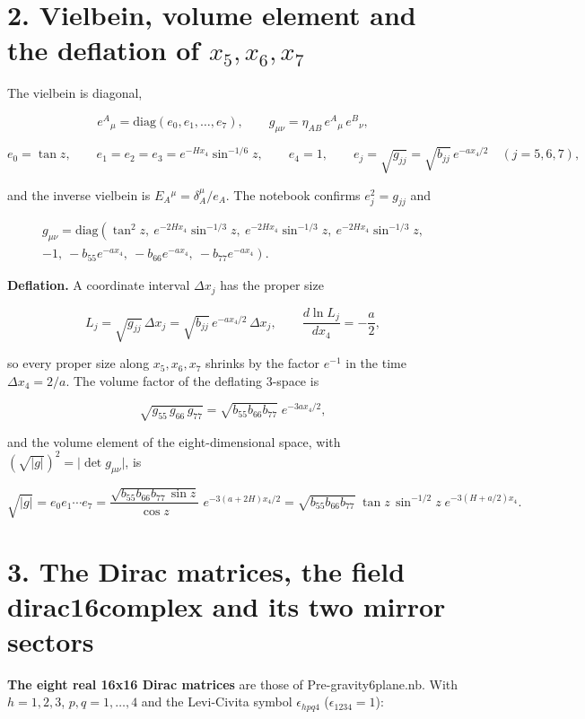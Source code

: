 \documentclass[10pt]{article}
\makeatletter
\newcommand\keepnext{\par\nopagebreak\@nobreaktrue\everypar{\@nobreakfalse\everypar{}}}
\makeatother
\begin{document}
\section*{2. Vielbein, volume element and the deflation of $x_5, x_6, x_7$}

The vielbein is diagonal,\keepnext


\[
e^A{}_\mu = \mathrm{diag}(e_0, e_1, \dots, e_7), \qquad g_{\mu\nu} = \eta_{AB}\,e^A{}_\mu\,e^B{}_\nu ,
\]

\[
e_0 = \tan z, \qquad e_1 = e_2 = e_3 = e^{-Hx_4}\sin^{-1/6}z, \qquad e_4 = 1, \qquad e_j = \sqrt{g_{jj}} = \sqrt{b_{jj}}\,e^{-ax_4/2} \quad (j = 5, 6, 7),
\]

and the inverse vielbein is $E_A{}^\mu = \delta_A^\mu/e_A$. The notebook confirms $e_j^2 = g_{jj}$ and\keepnext


\[
\begin{gathered}
g_{\mu\nu} = \mathrm{diag}\left(\tan^2 z,\ e^{-2Hx_4}\sin^{-1/3}z,\ e^{-2Hx_4}\sin^{-1/3}z,\ e^{-2Hx_4}\sin^{-1/3}z,\right. \\
\left. -1,\ -b_{55}e^{-ax_4},\ -b_{66}e^{-ax_4},\ -b_{77}e^{-ax_4}\right).
\end{gathered}
\]

\textbf{Deflation.} A coordinate interval $\Delta x_j$ has the proper size\keepnext


\[
L_j = \sqrt{g_{jj}}\,\Delta x_j = \sqrt{b_{jj}}\,e^{-ax_4/2}\,\Delta x_j, \qquad \frac{d\ln L_j}{dx_4} = -\frac a2 ,
\]

so every proper size along $x_5, x_6, x_7$ shrinks by the factor $e^{-1}$ in the time $\Delta x_4 = 2/a$. The volume factor of the deflating 3-space is\keepnext


\[
\sqrt{g_{55}\,g_{66}\,g_{77}} = \sqrt{b_{55}b_{66}b_{77}}\;e^{-3ax_4/2} ,
\]

and the volume element of the eight-dimensional space, with $\left(\sqrt{\lvert g\rvert}\right)^2 = \lvert\det g_{\mu\nu}\rvert$, is\keepnext


\[
\sqrt{\lvert g\rvert} = e_0e_1\cdots e_7 = \frac{\sqrt{b_{55}b_{66}b_{77}\,\sin z}}{\cos z}\;e^{-3(a+2H)x_4/2} = \sqrt{b_{55}b_{66}b_{77}}\;\tan z\,\sin^{-1/2}z\;e^{-3(H+a/2)x_4} .
\]

\section*{3. The Dirac matrices, the field dirac16complex and its two mirror sectors}

\textbf{The eight real 16x16 Dirac matrices} are those of Pre-gravity6plane.nb. With $h = 1, 2, 3$, $p, q = 1, \dots, 4$ and the Levi-Civita symbol $\epsilon_{hpq4}$ ($\epsilon_{1234} = 1$):\keepnext
\end{document}
